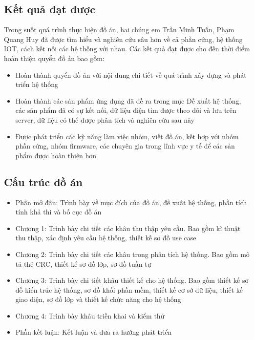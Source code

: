 \subsection*{Kết quả đạt được}

Trong suốt quá trình thực hiện đồ án, hai chúng em Trần Minh Tuấn, Phạm Quang Huy đã được tìm hiểu và nghiên cứu sâu hơn về cả phần cứng,
hệ thống IOT, cách kết nối các hệ thống với nhau. Các kết quả đạt được cho đến thời điểm hoàn thiện quyển đồ án bao gồm:

\begin{adjustwidth}{1.5em}{}
  \begin{itemize}
      \item Hoàn thành quyển đồ án với nội dung chi tiết về quá trình xây dựng và phát triển hệ thống
      \item Hoàn thành các sản phẩm ứng dụng đã đề ra trong mục Đề xuất hệ thống, các sản phẩm đã có sự kết nối, dữ liệu điện tim được theo dõi
      và lưu trên server, dữ liệu có thể được phân tích và nghiên cứu sau này
      \item Được phát triển các kỹ năng làm việc nhóm, viết đồ án, kết hợp với nhóm phần cứng, nhóm firmware, các chuyên gia trong lĩnh vực y tế để các sản phẩm được hoàn thiện hơn
    \end{itemize}
  \end{adjustwidth}
\subsection*{Cấu trúc đồ án}

\begin{adjustwidth}{1.5em}{}
\begin{itemize}
  \item Phần mở đầu: Trình bày về mục đích của đồ án, đề xuất hệ thống, phần tích tính khả thi và bố cục đồ án
  \item Chương 1: Trình bày chi tiết các khâu thu thập yêu cầu. Bao gồm kĩ thuật thu thập, xác định yêu cầu hệ thống, thiết kế sơ đồ use case
  \item Chương 2: Trình bày chi tiết các khâu trong phân tích hệ thống. Bao gồm mô tả thẻ CRC, thiết kế sơ đồ lớp, sơ đồ tuần tự
  \item Chương 3: Trình bày chi tiết khâu thiết kế cho hệ thống. Bao gồm thiết kế sơ đồ kiến trúc hệ thống, sơ đồ khối
  phần mềm, thiết kế cơ sở dữ liệu, thiết kế giao diện, sơ đồ lớp và thiết kế chức năng cho hệ thống
  \item Chương 4: Trình bày khâu triền khai và kiểm thử
  \item Phần kết luận: Kết luận và đưa ra hướng phát triển 
\end{itemize}
\end{adjustwidth}

\cleardoublepage

